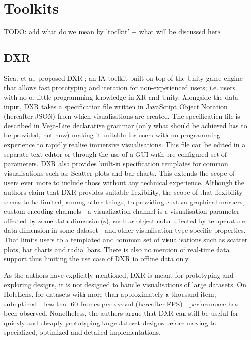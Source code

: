 \documentclass{vgtc}                          %
\begin{document}
\section{Toolkits}

TODO: add what do we mean by 'toolkit' + what will be discussed here

\subsection{DXR}

Sicat et al. proposed DXR \cite{dxr_toolkit}; an IA toolkit built on top of the Unity game engine
that allows fast prototyping and iteration for non-experienced users; i.e.
users with no or little programming knowledge in XR and Unity.
Alongside the data input, DXR takes a specification file written in JavaScript
Object Notation (hereafter JSON) from which visualisations are created.
The specification file is described in Vega-Lite declarative grammar \cite{vega_lite}
(only what should be achieved has to be provided, not how) making it suitable
for users with no programming experience to rapidly realise immersive
visualisations. This file can be edited in a separate text editor or through
the use of a GUI with pre-configured set of parameters. DXR also provides
built-in specification templates for common visualisations such as: Scatter
plots and bar charts. This extends the scope of users even more to include
those without any technical experience. Although the authors claim that DXR
provides suitable flexibility, the scope of that flexibility seems to be
limited, among other things, to providing custom graphical markers, custom
encoding channels - a visualization channel is a visualisation parameter affected by some
data dimension(s), such as object color affected by temperature data dimension in some dataset -
and other visualisation-type specific properties. That limits users to a
templated and common set of visualisations such as scatter plots, bar charts
and radial bars. There is also no mention of real-time data support thus
limiting the use case of DXR to offline data only.

\smallskip

\noindent As the authors have explicitly mentioned, DXR is meant for
prototyping and exploring designs, it is not designed to handle visualisations
of large datasets. On HoloLens, for datasets with more than approximately
a thousand item, suboptimal - less that 60 frames per second (hereafter FPS) -
performance has been observed. Nonetheless, the authors argue that DXR can still
be useful for quickly and cheaply prototyping large dataset designs before
moving to specialized, optimized and detailed implementations.
\end{document}
